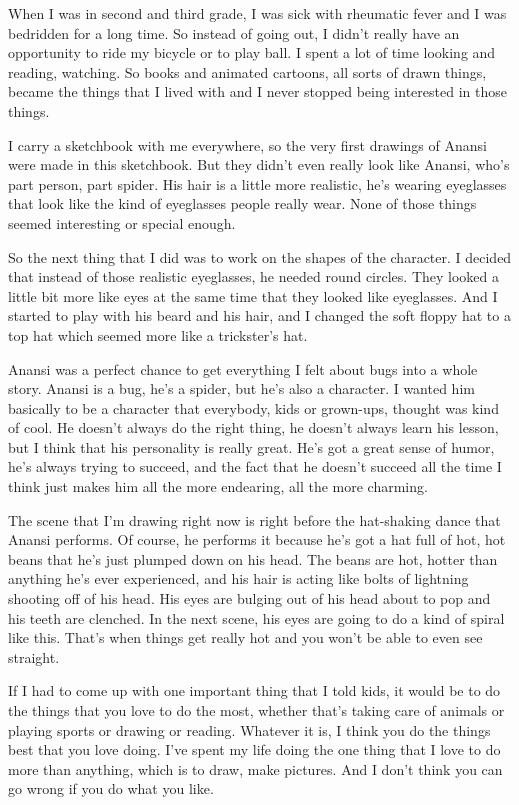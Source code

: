 When I was in second and third grade, I was sick with rheumatic fever and I was bedridden for a long time. So instead of going out, I didn't really have an opportunity to ride my bicycle or to play ball. I spent a lot of time looking and reading, watching. So books and animated cartoons, all sorts of drawn things, became the things that I lived with and I never stopped being interested in those things.

I carry a sketchbook with me everywhere, so the very first drawings of Anansi were made in this sketchbook. But they didn't even really look like Anansi, who's part person, part spider. His hair is a little more realistic, he's wearing eyeglasses that look like the kind of eyeglasses people really wear. None of those things seemed interesting or special enough.

So the next thing that I did was to work on the shapes of the character. I decided that instead of those realistic eyeglasses, he needed round circles. They looked a little bit more like eyes at the same time that they looked like eyeglasses. And I started to play with his beard and his hair, and I changed the soft floppy hat to a top hat which seemed more like a trickster's hat.

Anansi was a perfect chance to get everything I felt about bugs into a whole story. Anansi is a bug, he's a spider, but he's also a character. I wanted him basically to be a character that everybody, kids or grown-ups, thought was kind of cool. He doesn't always do the right thing, he doesn't always learn his lesson, but I think that his personality is really great. He's got a great sense of humor, he's always trying to succeed, and the fact that he doesn't succeed all the time I think just makes him all the more endearing, all the more charming.

The scene that I'm drawing right now is right before the hat-shaking dance that Anansi performs. Of course, he performs it because he's got a hat full of hot, hot beans that he's just plumped down on his head. The beans are hot, hotter than anything he's ever experienced, and his hair is acting like bolts of lightning shooting off of his head. His eyes are bulging out of his head about to pop and his teeth are clenched. In the next scene, his eyes are going to do a kind of spiral like this. That's when things get really hot and you won't be able to even see straight.

If I had to come up with one important thing that I told kids, it would be to do the things that you love to do the most, whether that's taking care of animals or playing sports or drawing or reading. Whatever it is, I think you do the things best that you love doing. I've spent my life doing the one thing that I love to do more than anything, which is to draw, make pictures. And I don't think you can go wrong if you do what you like.

